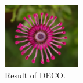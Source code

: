 \documentclass{article}
\begin{document}
\begin{CJK}{UTF8}{gbsn}
\begin{figure}[!h] 
	\centering 
	\begin{minipage}[c]{0.3\textwidth} 
		\centering 
		\includegraphics[width=\textwidth]{imgs/flower1.png}
		\caption{Result of DECO.}
	\end{minipage}%
	\begin{minipage}[c]{0.5\textwidth} 
		\centering 
		\hspace{0.01\linewidth}

\end{minipage}
\end{figure}
\end{CJK}
\end{document}
